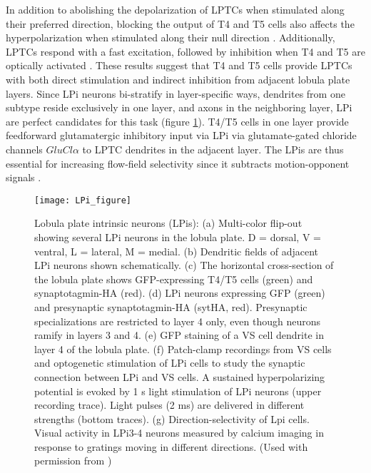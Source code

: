 In addition to abolishing the depolarization of LPTCs when stimulated along their preferred direction, blocking the output of T4 and T5 cells also affects the hyperpolarization when stimulated along their null direction \parencite{Schnell2012}. Additionally, LPTCs respond with a fast excitation, followed by inhibition when T4 and T5 are optically activated \parencite{Mauss2015}. These results suggest that T4 and T5 cells provide LPTCs with both direct stimulation and indirect inhibition from adjacent lobula plate layers. Since LPi neurons bi-stratify in layer-specific ways, dendrites from one subtype reside exclusively in one layer, and axons in the neighboring layer, LPi are perfect candidates for this task (figure \ref{fig:lpifigure}). T4/T5 cells in one layer provide feedforward glutamatergic inhibitory input via LPi via glutamate-gated chloride channels \textit{$GluCl\alpha$} to LPTC dendrites in the adjacent layer. The LPis are thus essential for increasing flow-field selectivity since it subtracts motion-opponent signals \parencite{Mauss2015}.

\begin{figure}
\centering
\hspace*{-1cm} 
\texttt{[image: LPi\_figure]}
\caption[Lobula plate intrinsic neurons (LPis)] {Lobula plate intrinsic neurons (LPis): (a) Multi-color flip-out showing several LPi neurons in the lobula plate. D = dorsal, V = ventral, L = lateral, M = medial. (b) Dendritic fields of adjacent LPi neurons shown schematically. (c) The horizontal cross-section of the lobula plate shows GFP-expressing T4/T5 cells (green) and synaptotagmin-HA (red). (d) LPi neurons expressing GFP (green) and presynaptic synaptotagmin-HA (sytHA, red). Presynaptic specializations are restricted to layer 4 only, even though neurons ramify in layers 3 and 4. (e) GFP staining of a VS cell dendrite in layer 4 of the lobula plate. (f) Patch-clamp recordings from VS cells and optogenetic stimulation of LPi cells to study the synaptic connection between LPi and VS cells. A sustained hyperpolarizing potential is evoked by 1 s light stimulation of LPi neurons (upper recording trace). Light pulses (2 ms) are delivered in different strengths (bottom traces). (g) Direction-selectivity of Lpi cells. Visual activity in LPi3-4 neurons measured by calcium imaging in response to gratings moving in different directions. (Used with permission from \parencite{Borst2020b})} 
\label{fig:lpifigure}
\end{figure}



